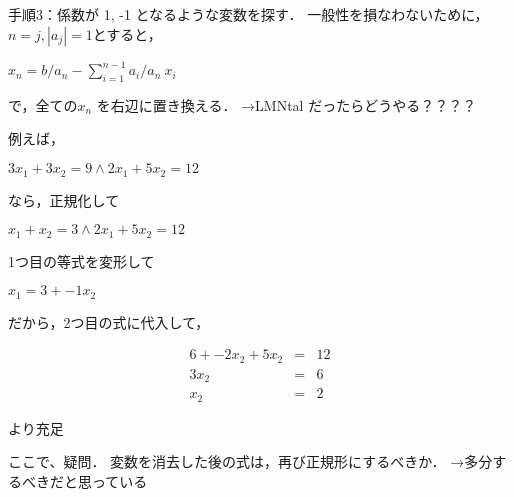 手順3：係数が 1, -1 となるような変数を探す．
一般性を損なわないために，$n=j, |a_j|=1$とすると，
\begin{center}
    $x_n = b/a_n - \sum_{i=1}^{n-1}a_i/a_n \:x_i$
\end{center}
で，全ての$x_n$ を右辺に置き換える．
→LMNtal だったらどうやる？？？？

例えば，
\begin{center}
    $3x_1 + 3x_2 = 9 \wedge 2x_1 + 5x_2 = 12$
\end{center}
なら，正規化して
\begin{center}
    $x_1 + x_2 = 3 \wedge 2x_1 + 5x_2 = 12$
\end{center}
1つ目の等式を変形して
\begin{center}
    $x_1 = 3 + -1x_2$
\end{center}
だから，2つ目の式に代入して，
\begin{center}
    \begin{eqnarray}
        6 + -2x_2 + 5x_2 &=& 12\\
        3x_2 &=& 6\\
        x_2 &=& 2
    \end{eqnarray}
\end{center}
より充足


ここで、疑問．
変数を消去した後の式は，再び正規形にするべきか．
→多分するべきだと思っている


